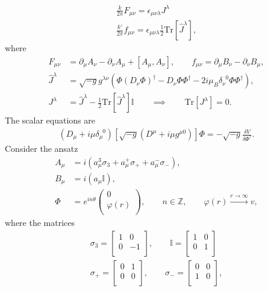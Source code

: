 \begin{align}
    \frac{k}{2 \pi} F_{\mu \nu} = \epsilon_{\mu \nu \lambda} J^{\lambda}\\
    \frac{k'}{2\pi} f_{\mu \nu} = \epsilon_{\mu \nu \lambda} \frac{1}{2} \mathrm{Tr} \left[\hat{J}^{\lambda} \right],
\end{align}
where
\begin{align}
    F_{\mu \nu}&= \partial_{\mu} A_{\nu} - \partial_{\nu}A_{\mu} + [A_{\mu}, A_{\nu}], \qquad f_{\mu \nu} = \partial_{\mu} B_{\nu} - \partial_{\nu} B_{\mu}, \\
    \hat{J}^{\lambda} &= \sqrt{-g} g^{\lambda \nu} \left( \Phi \left( D_{\nu} \Phi\right)^{\dag} - D_{\nu} \Phi \Phi^{\dag}   -2i \mu_B \delta^{\;\; 0}_{\nu} \Phi \Phi^{\dag}  \right), \\
    J^{\lambda} &= \hat{J}^{\lambda} - \frac{1}{2}\mathrm{Tr}\left[\hat{J}^{\lambda} \right]\mathbb{I} \qquad \implies \qquad \mathrm{Tr}\left[J^{\lambda}\right]=0.
\end{align}
The scalar equations are 
\begin{align}
    \left(D_{\mu} + i\mu \delta_{\mu}^{\;\; 0} \right) \left[\sqrt{-g} \left(D^{\mu}+i \mu g^{\mu 0}\right)\right] \Phi = - \sqrt{-g} \frac{\delta V}{\delta \Phi^{\dag}}. \label{eq:U2_scalar_EOM}
\end{align}
Consider the ansatz
\begin{align}
    A_{\mu} &= i \left(a_{\mu}^3 \sigma_3 + a_{\mu}^+ \sigma_{+} +a_{\mu}^{-} \sigma_{-} \right), \label{eq:U2_ansatz_non_abelian_gauge} \\
    B_{\mu} &= i \left( a_{\mu} \mathbb{I} \right), \label{eq:U2_ansatz_abelian_gauge}\\
    \Phi &=  e^{i n \theta} \begin{pmatrix}
        0\\
        \varphi(r)\\
    \end{pmatrix}, \qquad n\in \mathbb{Z}, \qquad \varphi(r) \xrightarrow{r \rightarrow \infty} v, \label{eq:U2_ansatz_scalar}
\end{align}
    where the matrices
    \begin{align}
        \sigma_3 = \begin{bmatrix}
            1 & 0 \\
            0 & -1 \\
        \end{bmatrix}, \qquad \mathbb{I}= \begin{bmatrix}
            1 & 0\\
            0 & 1\\
        \end{bmatrix} \\
        \sigma_+ =\begin{bmatrix}
            0 & 1\\
            0 & 0\\
        \end{bmatrix}, \qquad \sigma_- = \begin{bmatrix}
            0 &0\\
            1 &0\\
        \end{bmatrix},
    \end{align}
